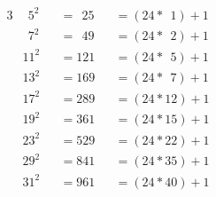 \begin{alignat*}{3}
&~~5^2&&=~~25&&=(24*~~1)+1\\
&~~7^2&&=~~49&&=(24*~~2)+1\\
&11^2&&=121&&=(24*~~5)+1\\
&13^2&&=169&&=(24*~~7)+1\\
&17^2&&=289&&=(24*12)+1\\
&19^2&&=361&&=(24*15)+1\\
&23^2&&=529&&=(24*22)+1\\
&29^2&&=841&&=(24*35)+1\\
&31^2&&=961&&=(24*40)+1
\end{alignat*}
